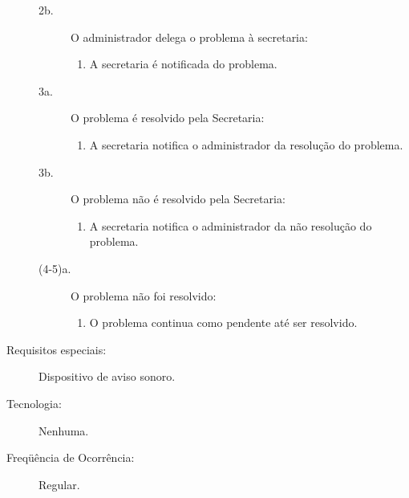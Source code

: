 \documentclass[brazil,times]{abnt}
\begin{document}
\begin{description}
\begin{description}
	\item[2b.] O administrador delega o problema à secretaria:
	\begin{enumerate}
  		\item A secretaria é notificada do problema.
	\end{enumerate}

	\item[3a.] O problema é resolvido pela Secretaria:
	\begin{enumerate}
  		\item A secretaria notifica o administrador da resolução do problema.
	\end{enumerate}

	\item[3b.] O problema não é resolvido pela Secretaria:
	\begin{enumerate}
  		\item A secretaria notifica o administrador da não resolução do problema.
	\end{enumerate}

	\item[(4-5)a.] O problema não foi resolvido:
	\begin{enumerate}
  		\item O problema continua como pendente até ser resolvido.
	\end{enumerate}
\end{description}

\item[Requisitos especiais:] Dispositivo de aviso sonoro.
\item[Tecnologia:] Nenhuma.
\item[Freqüência de Ocorrência:] Regular.

\end{description}
\end{document}
